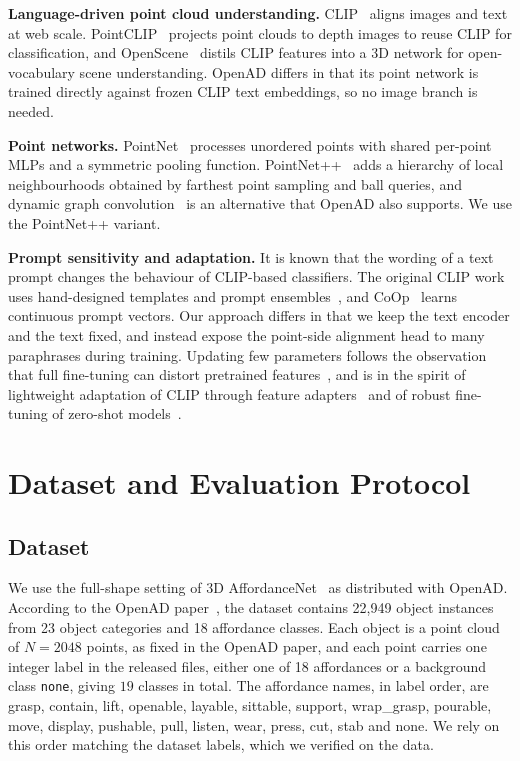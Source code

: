 \documentclass[conference]{IEEEtran}
\begin{document}
\textbf{Language-driven point cloud understanding.} CLIP~\cite{clip} aligns images and text at web scale. PointCLIP~\cite{pointclip} projects point clouds to depth images to reuse CLIP for classification, and OpenScene~\cite{openscene} distils CLIP features into a 3D network for open-vocabulary scene understanding. OpenAD differs in that its point network is trained directly against frozen CLIP text embeddings, so no image branch is needed.

\textbf{Point networks.} PointNet~\cite{pointnet} processes unordered points with shared per-point MLPs and a symmetric pooling function. PointNet++~\cite{pointnet2} adds a hierarchy of local neighbourhoods obtained by farthest point sampling and ball queries, and dynamic graph convolution~\cite{dgcnn} is an alternative that OpenAD also supports. We use the PointNet++ variant.

\textbf{Prompt sensitivity and adaptation.} It is known that the wording of a text prompt changes the behaviour of CLIP-based classifiers. The original CLIP work uses hand-designed templates and prompt ensembles~\cite{clip}, and CoOp~\cite{coop} learns continuous prompt vectors. Our approach differs in that we keep the text encoder and the text fixed, and instead expose the point-side alignment head to many paraphrases during training. Updating few parameters follows the observation that full fine-tuning can distort pretrained features~\cite{kumar2022}, and is in the spirit of lightweight adaptation of CLIP through feature adapters~\cite{clipadapter} and of robust fine-tuning of zero-shot models~\cite{wortsman2022}.

\section{Dataset and Evaluation Protocol}
\label{sec:data}

\subsection{Dataset}
We use the full-shape setting of 3D AffordanceNet~\cite{affordancenet} as distributed with OpenAD. According to the OpenAD paper~\cite{openad}, the dataset contains 22,949 object instances from 23 object categories and 18 affordance classes. Each object is a point cloud of $N=2048$ points, as fixed in the OpenAD paper, and each point carries one integer label in the released files, either one of 18 affordances or a background class \texttt{none}, giving $19$ classes in total. The affordance names, in label order, are grasp, contain, lift, openable, layable, sittable, support, wrap\_grasp, pourable, move, display, pushable, pull, listen, wear, press, cut, stab and none. We rely on this order matching the dataset labels, which we verified on the data.
\end{document}
